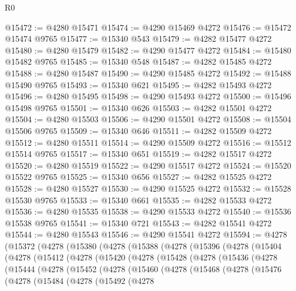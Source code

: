\begin{lexlean}{R0}
\begin{coremodule}
@15472 := @4280 @15471
@15474 := @4290 @15469 @4272
@15476 := @15472 @15474 @9765
@15477 := @15340 @543
@15479 := @4282 @15477 @4272
@15480 := @4280 @15479
@15482 := @4290 @15477 @4272
@15484 := @15480 @15482 @9765
@15485 := @15340 @548
@15487 := @4282 @15485 @4272
@15488 := @4280 @15487
@15490 := @4290 @15485 @4272
@15492 := @15488 @15490 @9765
@15493 := @15340 @621
@15495 := @4282 @15493 @4272
@15496 := @4280 @15495
@15498 := @4290 @15493 @4272
@15500 := @15496 @15498 @9765
@15501 := @15340 @626
@15503 := @4282 @15501 @4272
@15504 := @4280 @15503
@15506 := @4290 @15501 @4272
@15508 := @15504 @15506 @9765
@15509 := @15340 @646
@15511 := @4282 @15509 @4272
@15512 := @4280 @15511
@15514 := @4290 @15509 @4272
@15516 := @15512 @15514 @9765
@15517 := @15340 @651
@15519 := @4282 @15517 @4272
@15520 := @4280 @15519
@15522 := @4290 @15517 @4272
@15524 := @15520 @15522 @9765
@15525 := @15340 @656
@15527 := @4282 @15525 @4272
@15528 := @4280 @15527
@15530 := @4290 @15525 @4272
@15532 := @15528 @15530 @9765
@15533 := @15340 @661
@15535 := @4282 @15533 @4272
@15536 := @4280 @15535
@15538 := @4290 @15533 @4272
@15540 := @15536 @15538 @9765
@15541 := @15340 @721
@15543 := @4282 @15541 @4272
@15544 := @4280 @15543
@15546 := @4290 @15541 @4272
@15594 := @4278
    (@15372
      (@4278
        (@15380
          (@4278
            (@15388
              (@4278
                (@15396
                  (@4278
                    (@15404
                      (@4278
                        (@15412
                          (@4278
                            (@15420
                              (@4278
                                (@15428
                                  (@4278
                                    (@15436
                                      (@4278
                                        (@15444
                                          (@4278
                                            (@15452
                                              (@4278
                                                (@15460
                                                  (@4278
                                                    (@15468
                                                      (@4278
                                                        (@15476
                                                          (@4278
                                                            (@15484
                                                              (@4278
                                                                (@15492
                                                                  (@4278

\end{coremodule}
\end{lexlean}
